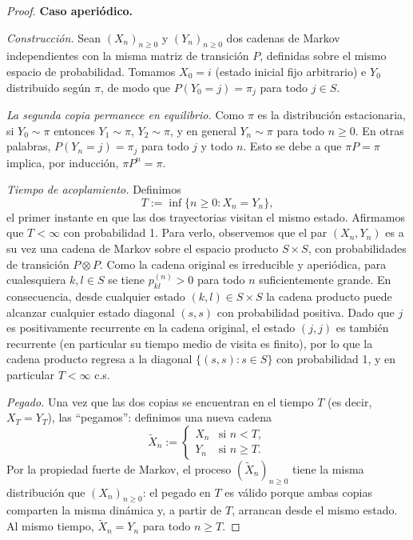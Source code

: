 \documentclass[12pt]{book}
\begin{document}
\begin{proof}
    \textbf{Caso aperiódico.}

    \smallskip
    \textit{Construcción.} Sean $(X_n)_{n\ge 0}$ y $(Y_n)_{n\ge 0}$ dos cadenas de Markov independientes con la misma matriz de transición $P$, definidas sobre el mismo espacio de probabilidad. Tomamos $X_0 = i$ (estado inicial fijo arbitrario) e $Y_0$ distribuido según $\pi$, de modo que $P(Y_0 = j) = \pi_j$ para todo $j \in S$.

    \smallskip
    \textit{La segunda copia permanece en equilibrio.} Como $\pi$ es la distribución estacionaria, si $Y_0 \sim \pi$ entonces $Y_1 \sim \pi$, $Y_2 \sim \pi$, y en general $Y_n \sim \pi$ para todo $n \ge 0$. En otras palabras, $P(Y_n = j) = \pi_j$ para todo $j$ y todo $n$. Esto se debe a que $\pi P = \pi$ implica, por inducción, $\pi P^n = \pi$.

    \smallskip
    \textit{Tiempo de acoplamiento.} Definimos
    \[
        T := \inf\{n \ge 0 : X_n = Y_n\},
    \]
    el primer instante en que las dos trayectorias visitan el mismo estado. Afirmamos que $T < \infty$ con probabilidad 1. Para verlo, observemos que el par $(X_n, Y_n)$ es a su vez una cadena de Markov sobre el espacio producto $S \times S$, con probabilidades de transición $P\otimes P$. Como la cadena original es irreducible y aperiódica, para cualesquiera $k, l \in S$ se tiene $p_{kl}^{(n)} > 0$ para todo $n$ suficientemente grande. En consecuencia, desde cualquier estado $(k, l) \in S \times S$ la cadena producto puede alcanzar cualquier estado diagonal $(s, s)$ con probabilidad positiva. Dado que $j$ es positivamente recurrente en la cadena original, el estado $(j, j)$ es también recurrente (en particular su tiempo medio de visita es finito), por lo que la cadena producto regresa a la diagonal $\{(s,s): s\in S\}$ con probabilidad 1, y en particular $T < \infty$ c.s.

    \smallskip
    \textit{Pegado.} Una vez que las dos copias se encuentran en el tiempo $T$ (es decir, $X_T = Y_T$), las ``pegamos'': definimos una nueva cadena
    \[
        \tilde{X}_n :=
        \begin{cases}
            X_n & \text{si } n < T, \\
            Y_n & \text{si } n \ge T.
        \end{cases}
    \]
    Por la propiedad fuerte de Markov, el proceso $(\tilde{X}_n)_{n\ge 0}$ tiene la misma distribución que $(X_n)_{n\ge 0}$: el pegado en $T$ es válido porque ambas copias comparten la misma dinámica y, a partir de $T$, arrancan desde el mismo estado. Al mismo tiempo, $\tilde{X}_n = Y_n$ para todo $n \ge T$.


\end{proof}
\end{document}
